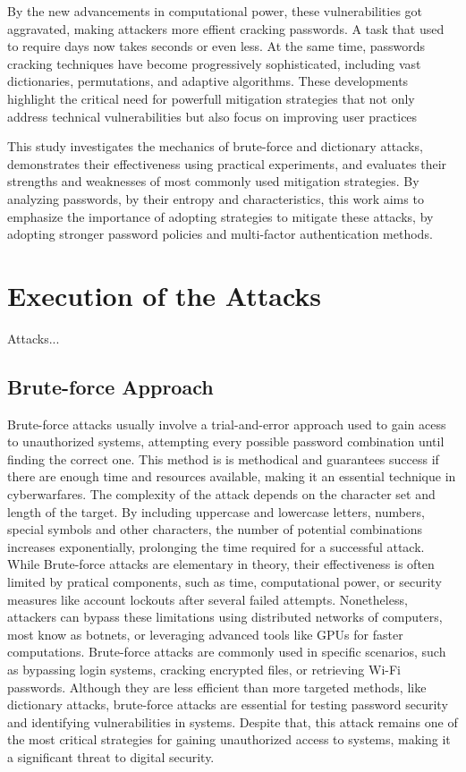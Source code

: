 \documentclass{comjnl}
\begin{document}
By the new advancements in computational power, these vulnerabilities got aggravated, making attackers more effient cracking passwords. A task that used to require days now takes seconds or even less. At the same time, passwords cracking techniques have become progressively sophisticated, including vast dictionaries, permutations, and adaptive algorithms. These developments highlight the critical need for powerfull mitigation strategies that not only address technical vulnerabilities but also focus on improving user practices 

This study investigates the mechanics of brute-force and dictionary attacks, demonstrates their effectiveness using practical experiments, and evaluates their strengths and weaknesses of most commonly used mitigation strategies. By analyzing passwords, by their entropy and characteristics, this work aims to emphasize the importance of adopting strategies to mitigate these attacks, by adopting stronger password policies and multi-factor authentication methods.

\section{Execution of the Attacks}

Attacks...

\subsection{Brute-force Approach}
Brute-force attacks usually involve a trial-and-error approach used to gain acess to unauthorized systems, attempting every possible password combination until finding the correct one. This method is  is methodical and guarantees success if there are enough time and resources available, making it an essential technique in cyberwarfares. The complexity of the attack depends on the character set and length of the target. By including uppercase and lowercase letters, numbers, special symbols and other characters, the number of potential combinations increases exponentially, prolonging the time required for a successful attack.  While Brute-force attacks are elementary in theory, their effectiveness is often limited by pratical components, such as time, computational power, or security measures like account lockouts after several failed attempts. Nonetheless, attackers can bypass these limitations using distributed networks of computers, most know as botnets, or leveraging advanced tools like GPUs for faster computations. Brute-force attacks are commonly used in specific scenarios, such as bypassing login systems, cracking encrypted files, or retrieving Wi-Fi passwords. Although they are less efficient than more targeted methods, like dictionary attacks, brute-force attacks are essential for testing password security and identifying vulnerabilities in systems. Despite that, this attack remains one of the most critical strategies for gaining unauthorized access to systems, making it a significant threat to digital security.
\end{document}
